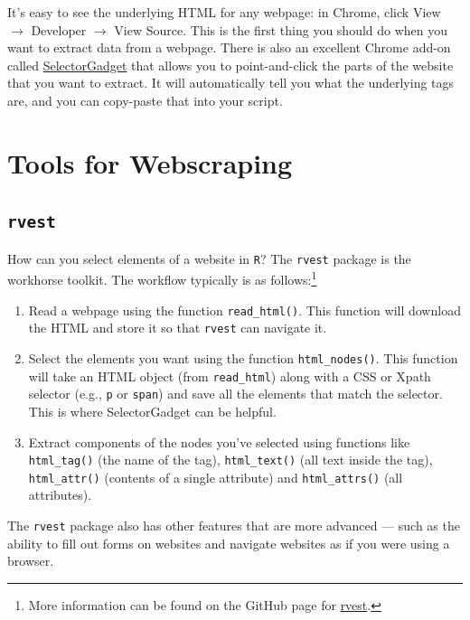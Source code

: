 \documentclass{article}\usepackage[]{graphicx}\usepackage[]{color}
\begin{document}
It's easy to see the underlying HTML for any webpage: in Chrome, click View $\rightarrow$ Developer $\rightarrow$ View Source. This is the first thing you should do when you want to extract data from a webpage. There is also an excellent Chrome add-on called \href{http://selectorgadget.com/}{SelectorGadget} that allows you to point-and-click the parts of the website that you want to extract. It will automatically tell you what the underlying tags are, and you can copy-paste that into your script. 

\section{Tools for Webscraping}

\subsection{\texttt{rvest}}
How can you select elements of a website in \texttt{R}? The \texttt{rvest} package is the workhorse toolkit. The workflow typically is as follows:\footnote{More information can be found on the GitHub page for \href{https://github.com/hadley/rvest}{rvest}.}
\begin{enumerate}
  \item Read a webpage using the function \verb!read_html()!. This function will download the HTML and store it so that \texttt{rvest} can navigate it. 
  \item Select the elements you want using the function \verb!html_nodes()!. This function will take an HTML object (from \verb!read_html!) along with a CSS or Xpath selector (e.g., \verb!p! or \verb!span!) and save all the elements that match the selector. This is where SelectorGadget can be helpful. 
  \item Extract components of the nodes you've selected using functions like \verb!html_tag()! (the name of the tag), \verb!html_text()! (all text inside the tag), \verb!html_attr()! (contents of a single attribute) and \verb!html_attrs()! (all attributes). 
\end{enumerate}

The \texttt{rvest} package also has other features that are more advanced --- such as the ability to fill out forms on websites and navigate websites as if you were using a browser. 
\end{document}
